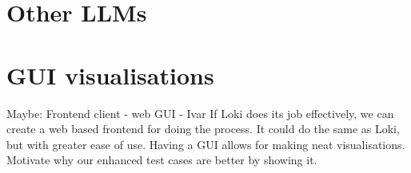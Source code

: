 \documentclass[UKenglish]{uiomasterthesis}  %
\begin{document}
\section{Other LLMs}

\section{GUI visualisations}

Maybe: Frontend client - web GUI - Ivar
If Loki does its job effectively, we can create a web based frontend for doing the process. It could do the same as Loki, but with greater ease of use.
Having a GUI allows for making neat visualisations.
Motivate why our enhanced test cases are better by showing it.

\backmatter{}
\printbibliography{}
\end{document}
